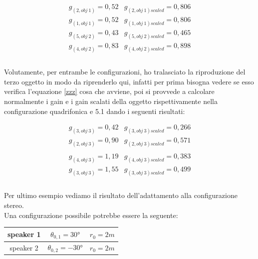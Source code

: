\documentclass[12pt,a4paper]{report}
\begin{document}
\begin{equation}
\begin{matrix}
g_{(2,obj\ 1)} = 0,52 & g_{(2,obj\ 1)scaled} = 0,806\\
g_{(1,obj\ 1)} = 0,52 & g_{(1,obj\ 1)scaled} = 0,806\\
g_{(5,obj\ 2)} = 0,43 & g_{(5,obj\ 2)scaled} = 0,465\\
g_{(4,obj\ 2)} = 0,83 & g_{(4,obj\ 2)scaled} = 0,898  \\

\end{matrix}
\label{gscalatiesempio2}
\end{equation} \\


Volutamente, per entrambe le configurazioni, ho tralasciato la riproduzione del terzo oggetto in modo da riprenderlo qui, infatti per prima bisogna vedere se esso verifica l'equazione \ref{zzz} cosa che avviene, poi si provvede a calcolare normalmente i gain e i gain scalati della oggetto rispettivamente nella configurazione quadrifonica e 5.1 dando i seguenti risultati:

\begin{equation}
\begin{matrix}
g_{(3,obj\ 3)} = 0,42 & g_{(3,obj\ 3)scaled} = 0,266\\
g_{(2,obj\ 3)} = 0,90 & g_{(2,obj\ 3)scaled} = 0,571\\
\\
g_{(4,obj\ 3)} = 1,19 & g_{(4,obj\ 3)scaled} = 0,383\\
g_{(3,obj\ 3)} = 1,55 & g_{(3,obj\ 3)scaled} = 0,499\\

\end{matrix}
\label{gscalatiesempiooggetto3}
\end{equation} \\



Per ultimo esempio vediamo il risultato dell'adattamento alla configurazione stereo.\\

Una configurazione possibile potrebbe essere la seguente:\\

\begin{tabular}{|c|c|c|}
\hline
speaker 1 & $\theta_{0,1}=30°$ & $r_0=2m$\\
\hline
speaker 2 & $\theta_{0,2}=-30°$ & $r_0=2m$\\
\hline
\end{tabular} \\
\\
\end{document}
